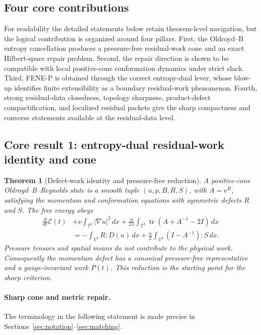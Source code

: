 \documentclass[11pt]{article}
\numberwithin{equation}{section}
\newtheorem{maintheorem}{Theorem}
\begin{document}
\subsection*{Four core contributions}
For readability the detailed statements below retain theorem-level navigation,
but the logical contribution is organized around four pillars.  First, the
Oldroyd--B entropy cancellation produces a pressure-free residual-work cone and
an exact Hilbert-space repair problem.  Second, the repair direction is shown to
be compatible with local positive-cone conformation dynamics under strict
slack.  Third, FENE-P is obtained through the correct entropy-dual lever, whose
blow-up identifies finite extensibility as a boundary residual-work phenomenon.
Fourth, strong residual-data closedness, topology sharpness, product-defect
compactification, and localized residual packets give the sharp compactness and
converse statements available at the residual-data level.


\subsection*{Core result 1: entropy-dual residual-work identity and cone}

\begin{maintheorem}[Defect-work identity and pressure-free reduction]
A positive-cone Oldroyd--B--Reynolds state is a smooth tuple
\((u,p,B,R,S)\), with \(A=e^B\), satisfying the momentum and conformation
equations with symmetric defects \(R\) and \(S\).  The free energy obeys
\[
\begin{aligned}
  \frac{d}{dt}\mathcal E(t)
  &+\nu\int_{\mathbb T^d}|\nabla u|^2\,dx
  +\frac{\alpha}{2\lambda}
   \int_{\mathbb T^d}\operatorname{tr}(A+A^{-1}-2I)\,dx \\
  &=
  -\int_{\mathbb T^d}R:D(u)\,dx
  +\frac{\alpha}{2}\int_{\mathbb T^d}(I-A^{-1}):S\,dx .
\end{aligned}
\]
Pressure tensors and spatial means do not contribute to the physical work.
Consequently the momentum defect has a canonical pressure-free representative
and a gauge-invariant work \(P(t)\).  This reduction is the starting point for
the sharp criterion.
\end{maintheorem}

\paragraph{Sharp cone and metric repair.}

The terminology in the following statement is made precise in
Sections~\ref{sec:notation}--\ref{sec:matching}.
\end{document}
